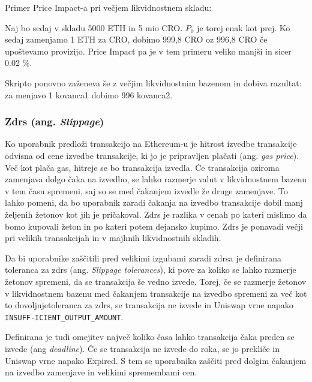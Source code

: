 \documentclass[a4paper,12pt]{article}%
\begin{document}
Primer Price Impact-a pri večjem likvidnostnem skladu:

Naj bo sedaj v skladu 5000 ETH in 5 mio CRO. $P_0$ je torej enak kot prej. Ko sedaj zamenjamo 1 ETH za CRO, dobimo 999,8 CRO oz 996,8 CRO če upoštevamo provizijo. Price Impact pa je v tem primeru veliko manjši in sicer 0.02 \%. 

Skripto ponovno zaženeva še z večjim likvidnostnim bazenom in dobiva razultat: za menjavo 1 kovanca1 dobimo 996 kovanca2.

\subsubsection{Zdrs (ang. \textit{Slippage})}

Ko uporabnik predloži transakcijo na Ethereum-u je hitrost izvedbe transakcije odvisna od cene izvedbe transakcije, ki jo je pripravljen plačati (ang. \textit{gas price}). Več kot plača gas, hitreje se bo transakcija izvedla. Če transakcija oziroma zamenjava dolgo čaka na izvedbo, se lahko razmerje valut v likvidnostnem bazenu v tem času spremeni, saj so se med čakanjem izvedle že druge zamenjave. To lahko pomeni, da bo uporabnik zaradi čakanja na izvedbo transakcije dobil manj željenih žetonov kot jih je pričakoval. Zdrs je razlika v cenah po kateri mislimo da bomo kupovali žeton in po kateri potem dejansko kupimo. Zdrs je ponavadi večji pri velikih transakcijah in v majhnih likvidnostnih skladih.

Da bi uporabnike zaščitili pred velikimi izgubami zaradi zdrsa je definirana toleranca za zdrs (ang. \textit{Slippage tolerances}), ki pove za koliko se lahko razmerje žetonov spremeni, da se transakcija še vedno izvede. Torej, če se razmerje žetonov v likvidnostnem bazenu med čakanjem transakcije na izvedbo spremeni za več kot to dovoljujetoleranca za zdrs, se transakcija ne izvede in Uniswap vrne napako \texttt{INSUFF-ICIENT\_OUTPUT\_AMOUNT}. 

Definirana je tudi omejitev največ koliko časa lahko transakcija čaka preden se izvede (ang \textit{deadline}). Če se transakcija ne izvede do roka, se jo prekliče in Uniswap vrne napako Expired. S tem se uporabnika zaščiti pred dolgim čakanjem na izvedbo zamenjave in velikimi spremembami cen.

\medskip
\end{document}
